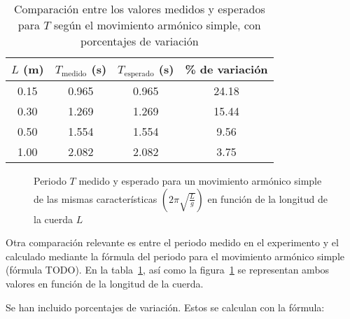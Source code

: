 \documentclass[letterpaper]{report}
\numberwithin{table}{section}
\begin{document}
\begin{table}[h]
  \centering
  \begin{tabular}{cccc}
    \toprule
    $L$ (m) & $T_{\text{medido}}$ (s) &
    $T_{\text{esperado}}$ (s) & \% de variación \\
    \midrule
    0.15 & 0.965 & 0.965 & 24.18 \\
    0.30 & 1.269 & 1.269 & 15.44 \\
    0.50 & 1.554 & 1.554 & 9.56 \\
    1.00 & 2.082 & 2.082 & 3.75 \\
    \bottomrule
  \end{tabular}

  \caption{Comparación entre los valores medidos y esperados para $T$
    según el movimiento armónico simple, con porcentajes de
  variación}\label{tab:comparación_longitud}
\end{table}

\begin{figure}[h]
  \centering
  \caption{Periodo $T$ medido y esperado para un movimiento armónico
    simple de las mismas características
    $\left(2\pi\sqrt{\frac{L}{g}}\right)$ en función de la longitud de
  la cuerda $L$}\label{fig:periodo_mas}
\end{figure}

Otra comparación relevante es entre el periodo medido en el
experimento y el calculado mediante la fórmula del periodo para el
movimiento armónico simple (fórmula {\color{red} TODO}). En la
tabla~\ref{tab:comparación_longitud}, así como la
figura~\ref{fig:periodo_mas} se representan ambos valores en
función de la longitud de la cuerda.

Se han incluido porcentajes de variación. Estos se calculan con la fórmula:
\end{document}
